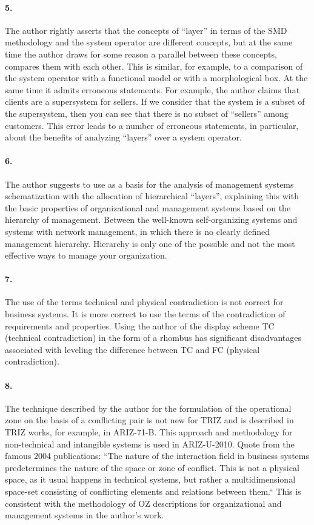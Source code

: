 \documentclass[11pt,a4paper]{article}
\begin{document}
\paragraph{5.}
The author rightly asserts that the concepts of “layer” in terms of the SMD
methodology and the system operator are different concepts, but at the same
time the author draws for some reason a parallel between these concepts,
compares them with each other. This is similar, for example, to a comparison
of the system operator with a functional model or with a morphological box. At
the same time it admits erroneous statements. For example, the author claims
that clients are a supersystem for sellers. If we consider that the system is
a subset of the supersystem, then you can see that there is no subset of
“sellers” among customers. This error leads to a number of erroneous
statements, in particular, about the benefits of analyzing “layers” over a
system operator.

\paragraph{6.}
The author suggests to use as a basis for the analysis of management systems
schematization with the allocation of hierarchical “layers”, explaining this
with the basic properties of organizational and management systems based on
the hierarchy of management. Between the well-known self-organizing systems
and systems with network management, in which there is no clearly defined
management hierarchy. Hierarchy is only one of the possible and not the most
effective ways to manage your organization.

\paragraph{7.}
The use of the terms technical and physical contradiction is not correct for
business systems. It is more correct to use the terms of the contradiction of
requirements and properties. Using the author of the display scheme TC
(technical contradiction) in the form of a rhombus has significant
disadvantages associated with leveling the difference between TC and FC
(physical contradiction).

\paragraph{8.}
The technique described by the author for the formulation of the operational
zone on the basis of a conflicting pair is not new for TRIZ and is described
in TRIZ works, for example, in ARIZ-71-B. This approach and methodology for
non-technical and intangible systems is used in ARIZ-U-2010. Quote from the
famous 2004 publications: “The nature of the interaction field in business
systems predetermines the nature of the space or zone of conflict. This is not
a physical space, as it usual happens in technical systems, but rather a
multidimensional space-set consisting of conflicting elements and relations
between them.“ This is consistent with the methodology of OZ descriptions for
organizational and management systems in the author's work.
\end{document}
